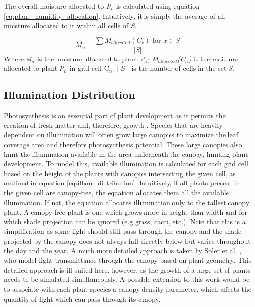 The overall moisture allocated to \textit{P$_{n}$} is calculated using equation \ref{eq:plant_humidity_allocation}. Intuitively, it is simply the average of all moisture allocated to it within all cells of \textit{S}.

\begin{equation}
M_{n} = \frac{\sum M_{allocated}(C_{x}) \text{ for } x \in S}{| S |}
\label{eq:plant_humidity_allocation}
\end{equation}
Where:\textit{M$_{n}$} is the moisture allocated to plant \textit{P$_{n}$}; \textit{M$_{allocated}$(C$_{n}$)} is the moisture allocated to plant \textit{P$_{n}$} in grid cell C$_{n}$; \textit{$|$ S $|$} is the number of cells in the set \textit{S}.\\

\subsection{Illumination Distribution}

Photosynthesis is an essential part of plant development as it permits the creation of fresh matter and, therefore, growth \cite{Soler2001}. Species that are heavily dependent on illumination will often grow large canopies to maximize the leaf coverage area and therefore photosynthesis potential. These large canopies also limit the illumination available in the area underneath the canopy, limiting plant development. To model this, available illumination is calculated for each grid cell based on the height of the plants with canopies intersecting the given cell, as outlined in equation \ref{eq:illum_distribution}. Intuitively, if all plants present in the given cell are canopy-free, the equation allocates them all the available illumination. If not, the equation allocates illumination only to the tallest canopy plant. A canopy-free plant is one which grows more in height than width and for which shade projection can be ignored (e.g grass, cacti, etc.). Note that this is a simplification as some light should still pass through the canopy and the shade projected by the canopy does not always fall directly below but varies throughout the day and the year. A much more detailed approach is taken by Soler et al. \cite{Soler2001}, who model light transmittance through the canopy based on plant geometry. This detailed approach is ill-suited here, however, as the growth of a large set of plants needs to be simulated simultaneously. A possible extension to this work would be to associate with each plant species a canopy density parameter, which affects the quantity of light which can pass through its canopy.

